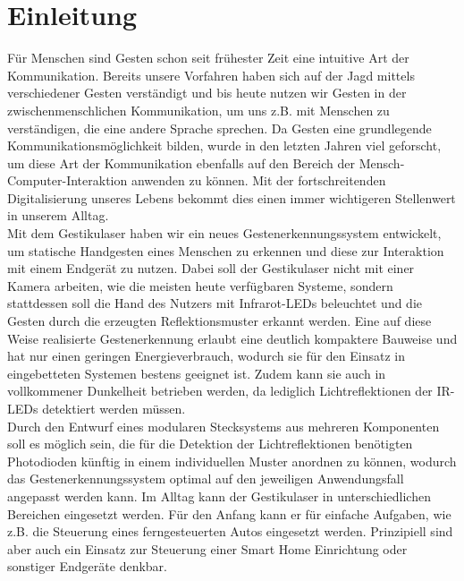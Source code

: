 \chapter{Einleitung}
\label{ch:Einleitung}

Für Menschen sind Gesten schon seit frühester Zeit eine intuitive Art der Kommunikation. Bereits unsere Vorfahren haben sich auf der Jagd mittels verschiedener Gesten verständigt und bis heute nutzen wir Gesten in der zwischenmenschlichen Kommunikation, um uns z.B. mit Menschen zu verständigen, die eine andere Sprache sprechen. Da Gesten eine grundlegende Kommunikationsmöglichkeit bilden, wurde in den letzten Jahren viel geforscht, um diese Art der Kommunikation ebenfalls auf den Bereich der Mensch-Computer-Interaktion anwenden zu können. Mit der fortschreitenden Digitalisierung unseres Lebens bekommt dies einen immer wichtigeren Stellenwert in unserem Alltag.\\
Mit dem Gestikulaser haben wir ein neues Gestenerkennungssystem entwickelt, um statische Handgesten eines Menschen zu erkennen und diese zur Interaktion mit einem Endgerät zu nutzen. Dabei soll der Gestikulaser nicht mit einer Kamera arbeiten, wie die meisten heute verfügbaren Systeme, sondern stattdessen soll die Hand des Nutzers mit Infrarot-LEDs beleuchtet und die Gesten durch die erzeugten Reflektionsmuster erkannt werden. Eine auf diese Weise realisierte Gestenerkennung erlaubt eine deutlich kompaktere Bauweise und hat nur einen geringen Energieverbrauch, wodurch sie für den Einsatz in eingebetteten Systemen bestens geeignet ist. Zudem kann sie auch in vollkommener Dunkelheit betrieben werden, da lediglich Lichtreflektionen der IR-LEDs detektiert werden müssen. \\
Durch den Entwurf eines modularen Stecksystems aus mehreren Komponenten soll es möglich sein, die für die Detektion der Lichtreflektionen benötigten Photodioden künftig in einem individuellen Muster anordnen zu können, wodurch das Gestenerkennungssystem optimal auf den jeweiligen Anwendungsfall angepasst werden kann. Im Alltag kann der Gestikulaser in unterschiedlichen Bereichen eingesetzt werden. Für den Anfang kann er für einfache Aufgaben, wie z.B. die Steuerung eines ferngesteuerten Autos eingesetzt werden. Prinzipiell sind aber auch ein Einsatz zur Steuerung einer Smart Home Einrichtung oder sonstiger Endgeräte denkbar.